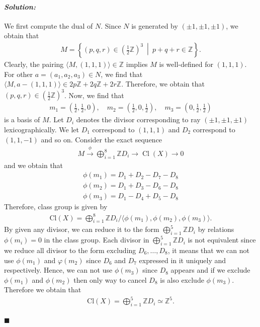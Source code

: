 \documentclass[12pt, a4paper]{article}
\newenvironment{solution}
  {\paragraph{\textit{Solution:}}\par\medskip}
  {\hfill$\blacksquare$\vspace{0.1cm}}
\begin{document}
\begin{solution}
    We first compute the dual of $N$. Since $N$ is generated by $(\pm 1, \pm 1, \pm 1)$, 
    we obtain that 
    \begin{align*}
        M = \left\{ (p,q,r) \in \left(\frac{1}{2}\mathbb{Z}\right)^3 \ \middle| \ p+q+r \in \mathbb{Z} \right\}.
    \end{align*}
    Clearly, the pairing $\langle M,(1,1,1)\rangle\in \mathbb{Z}$ implies $M$ is well-defined for $(1,1,1)$. For other $a=(a_1,a_2,a_3)\in N$, we find that $\langle M,a-(1,1,1)\rangle\in 2p\mathbb{Z}+2q\mathbb{Z}+2r\mathbb{Z}$.
    Therefore, we obtain that $(p,q,r) \in \left(\frac{1}{2}\mathbb{Z}\right)^3$. 
    Now, we find that 
    \begin{align*}
        m_1 = \left(\frac{1}{2}, \frac{1}{2}, 0\right), \quad m_2 = \left(\frac{1}{2}, 0, \frac{1}{2}\right), \quad m_3 = \left(0, \frac{1}{2}, \frac{1}{2}\right)
    \end{align*}
    is a basis of $M$. Let $D_i$ denotes the divisor corresponding to ray $(\pm 1, \pm 1, \pm 1)$ lexicographically. 
    We let $D_1$ correspond to $(1,1,1)$ and $D_2$ correspond to $(1,1,-1)$ and so on.
    Consider the exact sequence 
    \begin{align*}
    M \xrightarrow{\phi} \bigoplus_{i=1}^8 \mathbb{Z} D_i \to \operatorname{Cl}(X) \to 0
\end{align*}
and we obtain that 
\begin{align*}
    \phi(m_1) = D_1 + D_2 - D_7 - D_8 \\ \phi(m_2) = D_1 + D_3 - D_6 - D_8\\ \phi(m_3) = D_1 - D_4 + D_5 - D_8
\end{align*}
Therefore, class group is given by 
\begin{align*}
    \text{Cl}(X)= \bigoplus_{i=1}^8 \mathbb{Z} D_i/\langle \phi(m_1),\phi(m_2),\phi(m_3) \rangle.
\end{align*}
By given any divisor, we can reduce it to the form $\bigoplus_{i=1}^5 \mathbb{Z} D_i$ by relations $\phi(m_i)=0$ in the class group.
Each divisor in $\bigoplus_{i=1}^5 \mathbb{Z} D_i$ is not equivalent since we reduce all divisor to the form excluding $D_6,\dots,D_8$, it means that we can not 
use $\phi(m_1)$ and $\varphi(m_2)$ since $D_6$ and $D_7$ expressed in it uniquely and respectively.
Hence, we can not use $\phi(m_3)$ since $D_8$ appears and if we exclude $\phi(m_1)$ and $\phi(m_2)$ then only way to cancel $D_8$ is also exclude $\phi(m_3)$.
Therefore we obtain that 
\begin{align*}
    \text{Cl}(X) = \bigoplus_{i=1}^5 \mathbb{Z} D_i \simeq \mathbb{Z}^5.
\end{align*}


\end{solution}
\end{document}

